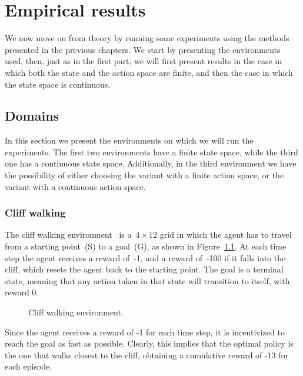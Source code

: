 \chapter{Empirical results} \label{ch:empirical_results}
We now move on from theory by running some experiments using the methods presented in the previous chapters. We start by presenting the environments used, then, just as in the first part, we will first present results in the case in which both the state and the action space are finite, and then the case in which the state space is continuous.

\section{Domains}
In this section we present the environments on which we will run the experiments. The first two environments have a finite state space, while the third one has a continuous state space. Additionally, in the third environment we have the possibility of either choosing the variant with a finite action space, or the variant with a continuous action space.

\subsection{Cliff walking}
The cliff walking environment~\cite[Example 6.6]{suttonbarto1998reinforcementlearning} is a~${4\times12}$ grid in which the agent has to travel from a starting point~{(S)} to a goal~{(G)}, as shown in Figure~\ref{fig:cliff_walking}. At each time step the agent receives a reward of~{-1}, and a reward of~{-100} if it falls into the cliff, which resets the agent back to the starting point. The goal is a terminal state, meaning that any action taken in that state will transition to itself, with reward 0.
\begin{figure}
\centering

\caption{Cliff walking environment.}
\label{fig:cliff_walking}
\end{figure}

Since the agent receives a reward of -1 for each time step, it is incentivized to reach the goal as fast as possible. Clearly, this implies that the optimal policy is the one that walks closest to the cliff, obtaining a cumulative reward of -13 for each episode.

